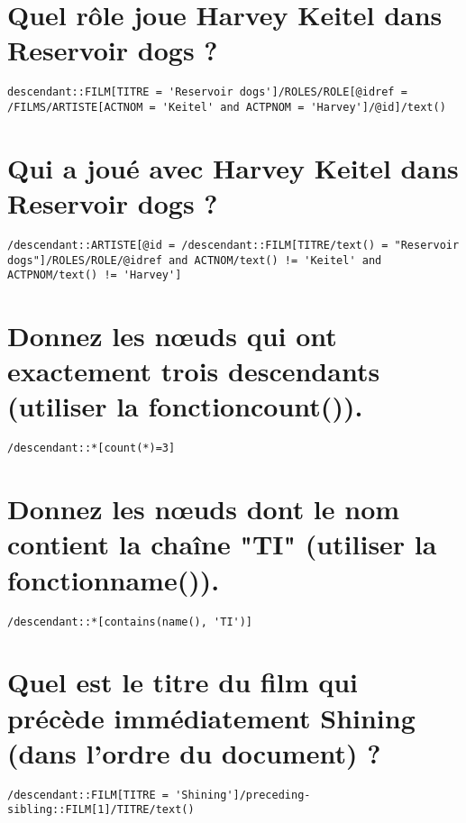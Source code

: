 \section{Quel rôle joue Harvey Keitel dans Reservoir dogs ?}
\begin{verbatim}
descendant::FILM[TITRE = 'Reservoir dogs']/ROLES/ROLE[@idref = /FILMS/ARTISTE[ACTNOM = 'Keitel' and ACTPNOM = 'Harvey']/@id]/text()
\end{verbatim}

\section{Qui a joué avec Harvey Keitel dans Reservoir dogs ?}
\begin{verbatim}
/descendant::ARTISTE[@id = /descendant::FILM[TITRE/text() = "Reservoir dogs"]/ROLES/ROLE/@idref and ACTNOM/text() != 'Keitel' and ACTPNOM/text() != 'Harvey']
\end{verbatim}

\section{Donnez les nœuds qui ont exactement trois descendants (utiliser la fonctioncount()).}
\begin{verbatim}
/descendant::*[count(*)=3]
\end{verbatim}

\section{Donnez les nœuds dont le nom contient la chaîne "TI" (utiliser la fonctionname()).}
\begin{verbatim}
/descendant::*[contains(name(), 'TI')] 
\end{verbatim}

\section{Quel est le titre du film qui précède immédiatement Shining (dans l’ordre du document) ?}
\begin{verbatim}
/descendant::FILM[TITRE = 'Shining']/preceding-sibling::FILM[1]/TITRE/text()
\end{verbatim}